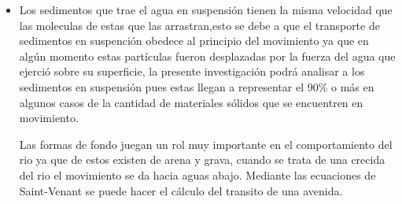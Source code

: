 \documentclass[12pt,a4paper]{report}
\begin{document}
\begin{itemize}
\item Los sedimentos que trae el agua en suspensión tienen la misma velocidad que las moleculas de estas que las arrastran,esto se debe a que el transporte de sedimentos en suspención obedece al principio del movimiento ya que en algún momento estas partículas fueron desplazadas por la fuerza del agua que ejerció sobre su superficie, la presente investigación podrá analisar a los sedimentos en suspensión pues estas llegan a representar el 90\% o más en algunos casos de la cantidad de materiales sólidos que se encuentren en movimiento.

Las formas de fondo juegan un rol muy importante en el comportamiento del rio ya que de estos existen de arena y grava, cuando se trata de una crecida del rio el movimiento se da hacia aguas abajo. Mediante las ecuaciones de Saint-Venant se puede hacer el cálculo del transito de una avenida.

\end{itemize}
\end{document}
